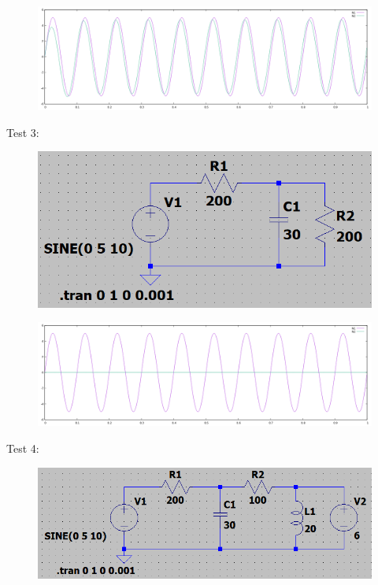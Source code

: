 \documentclass[12pt,a4paper]{article}
\begin{document}
\begin{figure} [h!]
	\centering
	\includegraphics[scale=0.25]{test_2_output_graph.PNG}
\end{figure}
\par
\pagebreak
Test 3:
\begin{figure} [h!]
	\centering
	\includegraphics[scale=0.75]{test_3_circuit.PNG}
\end{figure}
\begin{figure} [h!]
	\centering
	\includegraphics[scale=0.25]{test_3_output_graph.PNG}
\end{figure}
\par
\pagebreak
Test 4:
\begin{figure} [h!]
	\centering
	\includegraphics[scale=0.75]{test_4_circuit.PNG}
\end{figure}
\end{document}
